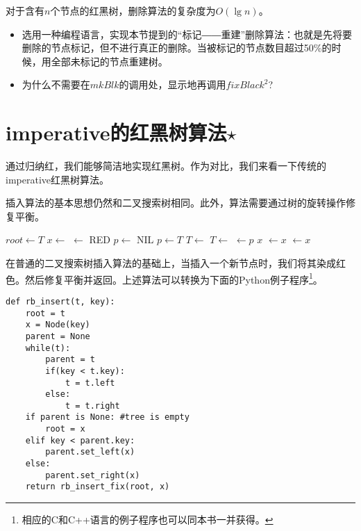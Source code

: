 \documentclass[UTF8]{article}
\begin{document}
对于含有$n$个节点的红黑树，删除算法的复杂度为$O(\lg n)$。

\begin{Exercise}

\begin{itemize}
\item 选用一种编程语言，实现本节提到的“标记――重建”删除算法：也就是先将要删除的节点标记，但不进行真正的删除。当被标记的节点数目超过50\%的时候，用全部未标记的节点重建树。
\item 为什么不需要在$mkBlk$的调用处，显示地再调用$fixBlack^2$?
\end{itemize}

\end{Exercise}

\section{imperative的红黑树算法$\star$}

通过归纳红，我们能够简洁地实现红黑树。作为对比，我们来看一下传统的imperative红黑树算法。

插入算法的基本思想仍然和二叉搜索树相同。此外，算法需要通过树的旋转操作修复平衡。

\begin{algorithmic}[1]
  \State $root \gets T$
  \State $x \gets$ 
  \State {} $\gets$ RED
  \State $p \gets$ NIL
    \State $p \gets T$
      \State $T \gets $ 
    \Else
      \State $T \gets $ 
    \EndIf
  \EndWhile
  \State {} $\gets p$
   
    \State \Return $x$
    \State {} $\gets x$
  \Else
    \State {} $\gets x$
  \EndIf
  \State \Return {}
\EndFunction
\end{algorithmic}

在普通的二叉搜索树插入算法的基础上，当插入一个新节点时，我们将其染成红色。然后修复平衡并返回。上述算法可以转换为下面的Python例子程序\footnote{相应的C和C++语言的例子程序也可以同本书一并获得。}。

\lstset{language=Python}
\begin{lstlisting}
def rb_insert(t, key):
    root = t
    x = Node(key)
    parent = None
    while(t):
        parent = t
        if(key < t.key):
            t = t.left
        else:
            t = t.right
    if parent is None: #tree is empty
        root = x
    elif key < parent.key:
        parent.set_left(x)
    else:
        parent.set_right(x)
    return rb_insert_fix(root, x)
\end{lstlisting}
\end{document}
